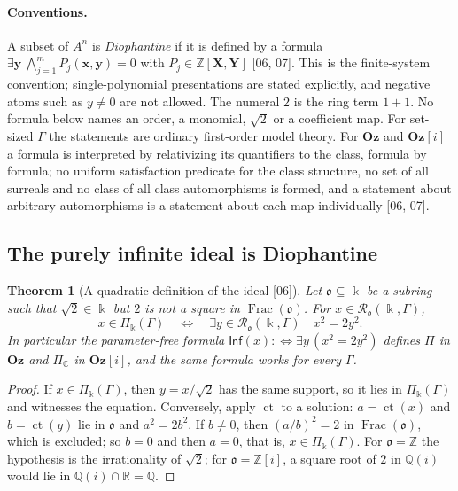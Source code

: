 \documentclass[11pt,oneside]{article}
\numberwithin{equation}{section}
\newtheorem{theorem}{Theorem}[section]
\theoremstyle{definition}
\theoremstyle{remark}
\newcommand{\Oz}{\mathbf{Oz}}
\newcommand{\Z}{\mathbb Z}
\newcommand{\Q}{\mathbb Q}
\newcommand{\R}{\mathbb R}
\newcommand{\C}{\mathbb C}
\newcommand{\ct}{\operatorname{ct}}
\newcommand{\Frac}{\operatorname{Frac}}
\newcommand{\src}[1]{\textup{\textsf{\small[#1]}}}
\newcommand{\Og}{\Oz[i]}
\begin{document}
\paragraph{Conventions.} A subset of $A^n$ is \emph{Diophantine} if it is
defined by a formula
$\exists\mathbf y\ \bigwedge_{j=1}^mP_j(\mathbf x,\mathbf y)=0$ with
$P_j\in\Z[\mathbf X,\mathbf Y]$ \src{06, 07}. This is the finite-system
convention; single-polynomial presentations are stated explicitly, and
negative atoms such as $y\ne0$ are not allowed. The numeral $2$ is the ring
term $1+1$. No formula below names an order, a monomial, $\sqrt2$ or a
coefficient map. For set-sized $\Gamma$ the statements are ordinary
first-order model theory. For $\Oz$ and $\Og$ a formula is interpreted by
relativizing its quantifiers to the class, formula by formula; no uniform
satisfaction predicate for the class structure, no set of all surreals and no
class of all class automorphisms is formed, and a statement about arbitrary
automorphisms is a statement about each map individually \src{06, 07}.

\subsection{The purely infinite ideal is Diophantine}

\begin{theorem}[A quadratic definition of the ideal \src{06}]\label{odg:def:thm:ideal}
Let $\mathfrak o\subseteq\Bbbk$ be a subring such that $\sqrt2\in\Bbbk$ but
$2$ is not a square in $\Frac(\mathfrak o)$. For
$x\in\mathcal R_{\mathfrak o}(\Bbbk,\Gamma)$,
\begin{equation}\label{odg:def:eq:ideal}
 x\in\Pi_\Bbbk(\Gamma)\quad\Longleftrightarrow\quad
 \exists y\in\mathcal R_{\mathfrak o}(\Bbbk,\Gamma)\quad x^2=2y^2 .
\end{equation}
In particular the parameter-free formula
$\mathsf{Inf}(x):\Leftrightarrow\exists y\,(x^2=2y^2)$ defines $\Pi$ in $\Oz$
and $\Pi_{\C}$ in $\Og$, and the same formula works for every $\Gamma$.
\end{theorem}
\begin{proof}
If $x\in\Pi_\Bbbk(\Gamma)$, then $y=x/\sqrt2$ has the same support, so it lies
in $\Pi_\Bbbk(\Gamma)$ and witnesses the equation. Conversely, apply $\ct$ to
a solution: $a=\ct(x)$ and $b=\ct(y)$ lie in $\mathfrak o$ and $a^2=2b^2$. If
$b\ne0$, then $(a/b)^2=2$ in $\Frac(\mathfrak o)$, which is excluded; so $b=0$
and then $a=0$, that is, $x\in\Pi_\Bbbk(\Gamma)$. For $\mathfrak o=\Z$ the
hypothesis is the irrationality of $\sqrt2$; for $\mathfrak o=\Z[i]$, a square
root of $2$ in $\Q(i)$ would lie in $\Q(i)\cap\R=\Q$.
\end{proof}
\end{document}
